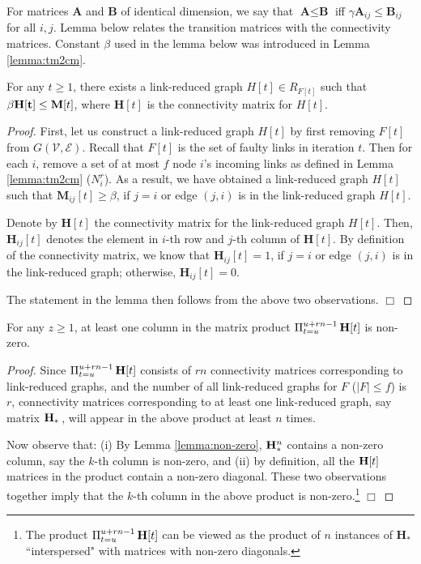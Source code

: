 \documentclass{llncs}
\newcommand{\fillbox}{\hspace*{\fill}\(\Box\)}
\newcommand{\scripte}{\mathcal{E}}
\newcommand{\scriptv}{\mathcal{V}}
\newcommand{\graphh}{\textit{H}}
\newcommand{\bfH}{{\bf H}}
\newcommand{\matrixm}{\textbf{M}}
\newcommand{\matrixh}{\textbf{H}}
\begin{document}
For matrices $\textbf{A}$ and $\textbf{B}$ of identical dimension, we say that $\textbf{A} \leq \textbf{B}$ iff $\gamma \textbf{A}_{ij} \leq \textbf{B}_{ij}$ for all $i, j$. Lemma below relates the transition matrices with the connectivity matrices. Constant $\beta$ used in the lemma below was introduced in
Lemma \ref{lemma:tm2cm}.


\begin{lemma}
\label{lemma:cm}
For any $t \geq 1$, there exists a link-reduced graph $\graphh[t] \in R_{F[t]}$ such  that $\beta {\normalfont\bf \matrixh[t] \leq \matrixm}[t]$, where $\matrixh[t]$ is the connectivity matrix for $\graphh[t]$.
\end{lemma}


\begin{proof}
First, let us construct a link-reduced graph $\graphh[t]$ by first removing $F[t]$ from $G(\scriptv, \scripte)$. Recall that $F[t]$ is the set of faulty links in iteration $t$. Then for each $i$, remove a set of at most $f$ node $i$'s incoming links as defined in Lemma \ref{lemma:tm2cm} ($N_i^r$). As a result, we have obtained a link-reduced graph $\graphh[t]$ such that $\matrixm_{ij}[t] \geq \beta$, if $j = i$ or edge
$(j, i)$ is in the link-reduced graph $\graphh[t]$.

Denote by $\matrixh[t]$ the connectivity matrix for the link-reduced graph $\graphh[t]$. Then, $\matrixh_{ij}[t]$ denotes the element
in $i$-th row and $j$-th column of $\matrixh[t]$. By definition of the connectivity matrix, we know that $\matrixh_{ij}[t] = 1$, if $j = i$ or edge $(j, i)$ is in the link-reduced graph; otherwise, $\matrixh_{ij}[t] = 0$.

The statement in the lemma then follows from the above two observations.
\fillbox
\end{proof}



\begin{lemma}
\label{l_product_H}
For any $z\geq 1$,
at least one column in the matrix product $\Pi_{t=u}^{u+r n-1} \, \bfH[t]$ is non-zero. 
\end{lemma}



\begin{proof}
Since $\Pi_{t=u}^{u+r n-1} \, \bfH[t]$ consists of $r n$ connectivity matrices
corresponding to link-reduced graphs, and the number of all link-reduced graphs for $F$ ($|F| \leq f$) is $r$,
connectivity matrices corresponding to at least one link-reduced graph, say matrix $\bfH_*$\,, will appear in the above product at least $n$ times.

Now observe that: (i)
By Lemma \ref{lemma:non-zero}, $\bfH_*^{n}$ contains a non-zero
column, say the $k$-th column is non-zero,
and (ii) by definition, all the $\bfH[t]$ matrices in the product contain a non-zero diagonal. These two observations together imply that the $k$-th column in the above product is non-zero.\footnote{The product $\Pi_{t=u}^{u+r n-1} \, \bfH[t]$ can be viewed as the product of $n$ instances of $\matrixh_*$ ``interspersed" with matrices with non-zero diagonals.}
\fillbox
\end{proof}
\end{document}
